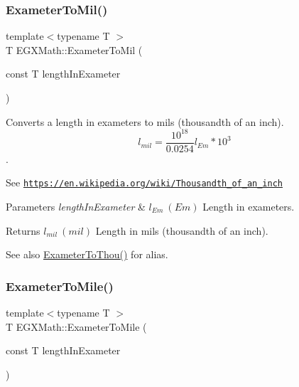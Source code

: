 \subsubsection{\texorpdfstring{Exameter\+To\+Mil()}{ExameterToMil()}}
{\footnotesize\ttfamily template$<$typename T $>$ \\
T E\+G\+X\+Math\+::\+Exameter\+To\+Mil (\begin{DoxyParamCaption}\item[{const T}]{length\+In\+Exameter }\end{DoxyParamCaption})}



Converts a length in exameters to mils (thousandth of an inch). \[ l_{mil}= \frac{10^{18}}{0.0254} l_{Em} * 10^{3} \]. 

See \href{https://en.wikipedia.org/wiki/Thousandth_of_an_inch}{\tt https\+://en.\+wikipedia.\+org/wiki/\+Thousandth\+\_\+of\+\_\+an\+\_\+inch} 
\begin{DoxyParams}{Parameters}
{\em length\+In\+Exameter} & $ l_{Em}\ (Em)$ Length in exameters. \\
\hline
\end{DoxyParams}
\begin{DoxyReturn}{Returns}
$ l_{mil}\ (mil)$ Length in mils (thousandth of an inch). 
\end{DoxyReturn}
\begin{DoxySeeAlso}{See also}
\mbox{\hyperlink{group___e_g_x_math-_conversions-_length_conversions-_exameter-_imperial_gafee1930a425fcae4f9a3d8631aa62b05}{Exameter\+To\+Thou()}} for alias. 
\end{DoxySeeAlso}
\mbox{\label{group___e_g_x_math-_conversions-_length_conversions-_exameter-_imperial_ga352ae8fb1bf743a0978e3ed05b06b61b}} 
\subsubsection{\texorpdfstring{Exameter\+To\+Mile()}{ExameterToMile()}}
{\footnotesize\ttfamily template$<$typename T $>$ \\
T E\+G\+X\+Math\+::\+Exameter\+To\+Mile (\begin{DoxyParamCaption}\item[{const T}]{length\+In\+Exameter }\end{DoxyParamCaption})}



